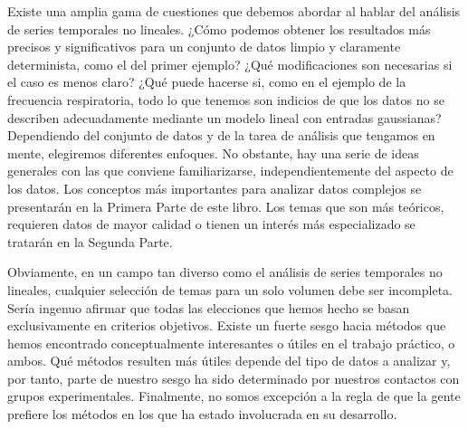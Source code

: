\documentclass[10pt,a4paper]{book}
\begin{document}
\bigskip

Existe una amplia gama de cuestiones que debemos abordar al hablar del análisis de series temporales no lineales. ¿Cómo podemos obtener los resultados más precisos y significativos para un conjunto de datos limpio y claramente determinista, como el del primer ejemplo? ¿Qué modificaciones son necesarias si el caso es menos claro? ¿Qué puede hacerse si, como en el ejemplo de la frecuencia respiratoria, todo lo que tenemos son indicios de que los datos no se describen adecuadamente mediante un modelo lineal con entradas gaussianas? Dependiendo del conjunto de datos y de la tarea de análisis que tengamos en mente, elegiremos diferentes enfoques. No obstante, hay una serie de ideas generales con las que conviene familiarizarse, independientemente del aspecto de los datos. Los conceptos más importantes para analizar datos complejos se presentarán en la Primera Parte de este libro. Los temas que son más teóricos, requieren datos de mayor calidad o tienen un interés más especializado se tratarán en la Segunda Parte.

\bigskip

Obviamente, en un campo tan diverso como el análisis de series temporales no lineales, cualquier selección de temas para un solo volumen debe ser incompleta. Sería ingenuo afirmar que todas las elecciones que hemos hecho se basan exclusivamente en criterios objetivos. Existe un fuerte sesgo hacia métodos que hemos encontrado conceptualmente interesantes o útiles en el trabajo práctico, o ambos. Qué métodos resulten más útiles depende del tipo de datos a analizar y, por tanto, parte de nuestro sesgo ha sido determinado por nuestros contactos con grupos experimentales. Finalmente, no somos excepción a la regla de que la gente prefiere los métodos en los que ha estado involucrada en su desarrollo.
\end{document}
